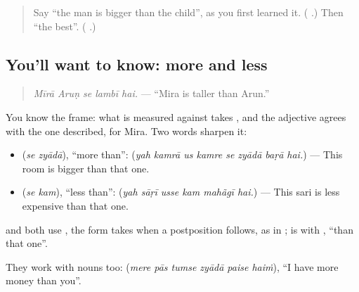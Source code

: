\label{lesson:HI-C285-sezyada}



\begin{quote}
Say \textquotedblleft{}the man is bigger than the child\textquotedblright{}, as you first learned it. (\textbf{    }.) Then \textquotedblleft{}the best\textquotedblright{}. (\textbf{ }.)
\end{quote}

\subsection*{You'll want to know: more and less}
\begin{quote}
\textbf{    }
\end{quote}

\begin{quote}
\emph{Mīrā Aruṇ se lambī hai.} — \textquotedblleft{}Mira is taller than Arun.\textquotedblright{}
\end{quote}

You know the frame: what is measured against takes \textbf{}, and the adjective agrees with the one described, \textbf{} for Mira. Two words sharpen it:

\begin{itemize}
\raggedright
  \item \textbf{ } (\emph{se zyādā}), \textquotedblleft{}more than\textquotedblright{}: \textbf{       } (\emph{yah kamrā us kamre se zyādā baṛā hai.}) — This room is bigger than that one.
  \item \textbf{ } (\emph{se kam}), \textquotedblleft{}less than\textquotedblright{}: \textbf{     } (\emph{yah sāṛī usse kam mahãgī hai.}) — This sari is less expensive than that one.
\end{itemize}

\textbf{  } and \textbf{} both use \textbf{}, the form \textbf{} takes when a postposition follows, as in \textbf{ }; \textbf{} is \textbf{} with \textbf{}, \textquotedblleft{}than that one\textquotedblright{}.

They work with nouns too: \textbf{     } (\emph{mere pās tumse zyādā paise haiṁ}), \textquotedblleft{}I have more money than you\textquotedblright{}.

